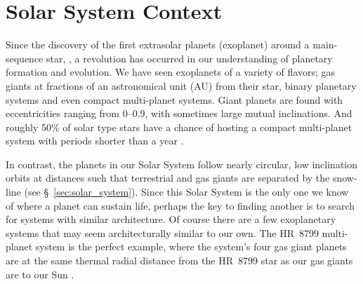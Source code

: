 \section{Solar System Context}\label{sec:ch1_context}

    Since the discovery of the first extrasolar planets (exoplanet) around a main-sequence star, \citep[HD~114762~b and 51~Pegasi~b,][respectively]{Latham1989, Mayor1995}, a revolution has occurred in our understanding of planetary formation and evolution. We have seen exoplanets of a variety of flavors; gas giants at fractions of an astronomical unit (AU) from their star, binary planetary systems and even compact multi-planet systems. Giant planets are found with eccentricities ranging from 0--0.9, with sometimes large mutual inclinations. And roughly 50\% of solar type stars have a chance of hosting a compact multi-planet system with periods shorter than a year \citep[see review by][]{Winn2015}. 
    
    In contrast, the planets in our Solar System follow nearly circular, low inclination orbits at distances such that terrestrial and gas giants are separated by the snow-line (see \S~\ref{sec:solar_system}). Since this Solar System is the only one we know of where a planet can sustain life, perhaps the key to finding another is to search for systems with similar architecture. Of course there are a few exoplanetary systems that may seem architecturally similar to our own. The HR~8799 multi-planet system is the perfect example, where the system's four gas giant planets are at the same thermal radial distance from the HR~8799 star as our gas giants are to our Sun \citep{Marois2010}. 
    

